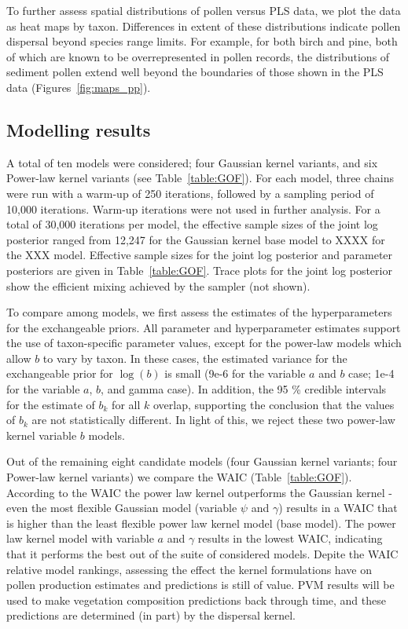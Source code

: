 \documentclass[12pt]{article}
\begin{document}
To further assess spatial distributions of pollen versus PLS data, we
plot the data as heat maps by taxon. Differences in extent of these
distributions indicate pollen dispersal beyond species range
limits. For example, for both birch and pine, both of which are known
to be overrepresented in pollen records, the distributions of sediment
pollen extend well beyond the boundaries of those shown in the PLS
data (Figures~\ref{fig:maps_pp}).

\subsection{Modelling results}

A total of ten models were considered; four Gaussian kernel variants,
and six Power-law kernel variants (see Table~\ref{table:GOF}). For each
model, three chains were run with a warm-up of 250 iterations,
followed by a sampling period of 10,000 iterations. Warm-up iterations
were not used in further analysis. For a total of 30,000 iterations
per model, the effective sample sizes of the joint log posterior
ranged from 12,247 for the Gaussian kernel base model to XXXX for the
XXX model. Effective sample sizes for the joint log posterior and
parameter posteriors are given in Table~\ref{table:GOF}. Trace plots for
the joint log posterior show the efficient mixing achieved by the
sampler (not shown).

To compare among models, we first assess the estimates of the
hyperparameters for the exchangeable priors. All parameter and
hyperparameter estimates support the use of taxon-specific parameter
values, except for the power-law models which allow $b$ to vary by
taxon. In these cases, the estimated variance for the exchangeable
prior for $\log ( b )$ is small (9e-6 for the variable $a$ and $b$ case;
1e-4 for the variable $a$, $b$, and gamma case). In addition, the 95 \%
credible intervals for the estimate of $b_k$ for all $k$ overlap,
supporting the conclusion that the values of $b_k$ are not
statistically different. In light of this, we reject these two
power-law kernel variable $b$ models. 

Out of the remaining eight candidate models (four Gaussian kernel
variants; four Power-law kernel variants) we compare the WAIC
(Table~\ref{table:GOF}). According to the WAIC the power law kernel
outperforms the Gaussian kernel - even the most flexible Gaussian
model (variable $\psi$ and $\gamma$) results in a WAIC that is higher
than the least flexible power law kernel model (base model). The power
law kernel model with variable $a$ and $\gamma$ results in the lowest
WAIC, indicating that it performs the best out of the suite of
considered models. Depite the WAIC relative model rankings, assessing
the effect the kernel formulations have on pollen production estimates
and predictions is still of value. PVM results will be used to make
vegetation composition predictions back through time, and these
predictions are determined (in part) by the dispersal kernel.
\end{document}
